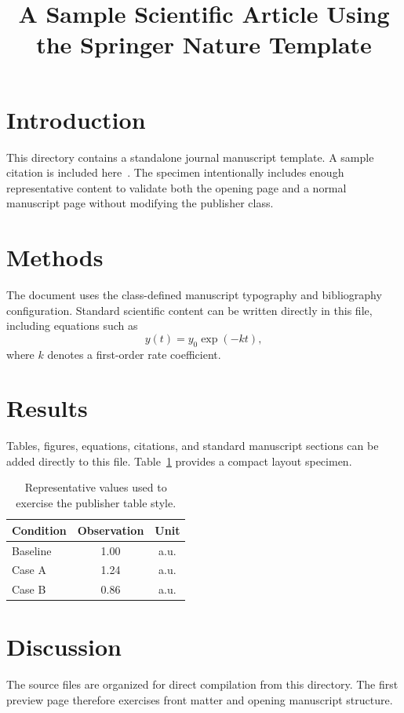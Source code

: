 \documentclass[pdflatex,sn-nature]{sn-jnl}
\title[Sample Springer Nature Article]{A Sample Scientific Article Using the Springer Nature Template}
\author*[1]{\fnm{First} \sur{Author}}\email{author@example.com}
\affil*[1]{\orgdiv{Department}, \orgname{Research Institution}, \orgaddress{\city{City}, \country{Country}}}
\begin{document}
\maketitle

\section{Introduction}
This directory contains a standalone journal manuscript template. A sample citation is included here~\cite{sample2026}. The specimen intentionally includes enough representative content to validate both the opening page and a normal manuscript page without modifying the publisher class.

\section{Methods}
The document uses the class-defined manuscript typography and bibliography configuration. Standard scientific content can be written directly in this file, including equations such as
\begin{equation}
  y(t)=y_0\exp(-kt),
\end{equation}
where $k$ denotes a first-order rate coefficient.

\section{Results}
Tables, figures, equations, citations, and standard manuscript sections can be added directly to this file. Table~\ref{tab:sample} provides a compact layout specimen.

\begin{table}[htbp]
\caption{Representative values used to exercise the publisher table style.}\label{tab:sample}
\centering
\begin{tabular}{lcc}
\toprule
Condition & Observation & Unit \\
\midrule
Baseline & 1.00 & a.u. \\
Case A & 1.24 & a.u. \\
Case B & 0.86 & a.u. \\
\bottomrule
\end{tabular}
\end{table}

\section{Discussion}
The source files are organized for direct compilation from this directory. The first preview page therefore exercises front matter and opening manuscript structure.
\end{document}
